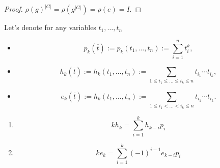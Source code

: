 \documentclass[12pt,a4paper]{article}
\begin{document}
    \begin{proof}
        $\rho(g)^{|G|} = \rho(g^{|G|}) = \rho(e) = I$.
    \end{proof}

    \breaker

    \begin{definition}
        Let's denote for any variables $t_1, \dots, t_n$
        \begin{itemize}
            \item \[p_k(\overline{t}) := p_k(t_1, \dots, t_n) := \sum_{i=1}^n t_i^k,\]
            \item \[h_k(\overline{t}) := h_k(t_1, \dots, t_n) := \sum_{1 \leqslant i_1 \leqslant \dots \leqslant i_k \leqslant n} t_{i_1} \cdots t_{i_k},\]
            \item \[e_k(\overline{t}) := h_k(t_1, \dots, t_n) := \sum_{1 \leqslant i_1 < \dots < i_k \leqslant n} t_{i_1} \cdots t_{i_k}.\]
        \end{itemize}
    \end{definition}

    \begin{lemma}
        \begin{enumerate}
            \item \[kh_k = \sum_{i=1}^k h_{k-i} p_i\]
            \item \[ke_k = \sum_{i=1}^k (-1)^{i-1}e_{k-i} p_i\]
        \end{enumerate}
    \end{lemma}
\end{document}
